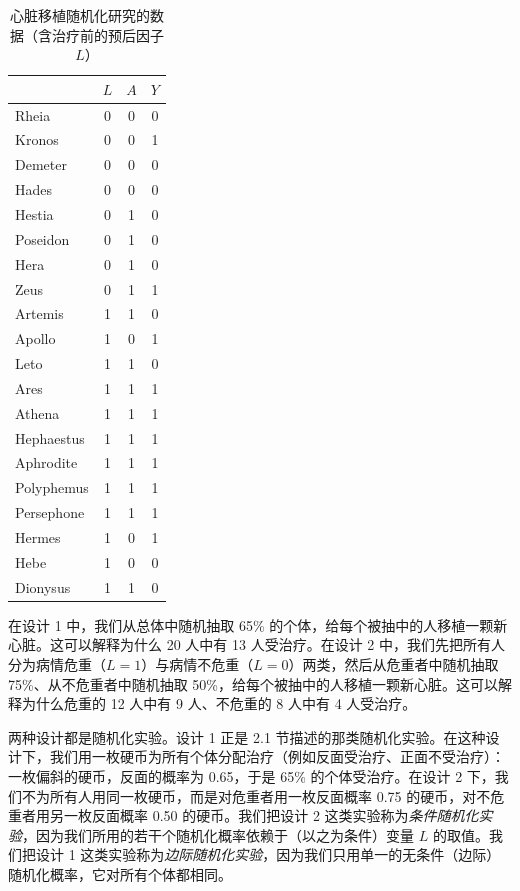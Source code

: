 \begin{table}[t]
\centering
\caption{心脏移植随机化研究的数据（含治疗前的预后因子 $L$）}
\label{tab:2.2}
\small
\begin{tabular}{lccc}
\toprule
& $L$ & $A$ & $Y$\\
\midrule
Rheia      & 0 & 0 & 0\\
Kronos     & 0 & 0 & 1\\
Demeter    & 0 & 0 & 0\\
Hades      & 0 & 0 & 0\\
Hestia     & 0 & 1 & 0\\
Poseidon   & 0 & 1 & 0\\
Hera       & 0 & 1 & 0\\
Zeus       & 0 & 1 & 1\\
Artemis    & 1 & 1 & 0\\
Apollo     & 1 & 0 & 1\\
Leto       & 1 & 1 & 0\\
Ares       & 1 & 1 & 1\\
Athena     & 1 & 1 & 1\\
Hephaestus & 1 & 1 & 1\\
Aphrodite  & 1 & 1 & 1\\
Polyphemus & 1 & 1 & 1\\
Persephone & 1 & 1 & 1\\
Hermes     & 1 & 0 & 1\\
Hebe       & 1 & 0 & 0\\
Dionysus   & 1 & 1 & 0\\
\bottomrule
\end{tabular}
\end{table}

在设计 1 中，我们从总体中随机抽取 65\% 的个体，给每个被抽中的人移植一颗新心脏。这可以解释为什么 20 人中有 13 人受治疗。在设计 2 中，我们先把所有人分为病情危重（$L=1$）与病情不危重（$L=0$）两类，然后从危重者中随机抽取 75\%、从不危重者中随机抽取 50\%，给每个被抽中的人移植一颗新心脏。这可以解释为什么危重的 12 人中有 9 人、不危重的 8 人中有 4 人受治疗。

两种设计都是随机化实验。设计 1 正是 2.1 节描述的那类随机化实验。在这种设计下，我们用一枚硬币为所有个体分配治疗（例如反面受治疗、正面不受治疗）：一枚偏斜的硬币，反面的概率为 0.65，于是 65\% 的个体受治疗。在设计 2 下，我们不为所有人用同一枚硬币，而是对危重者用一枚反面概率 0.75 的硬币，对不危重者用另一枚反面概率 0.50 的硬币。我们把设计 2 这类实验称为\emph{条件随机化实验}，因为我们所用的若干个随机化概率依赖于（以之为条件）变量 $L$ 的取值。我们把设计 1 这类实验称为\emph{边际随机化实验}，因为我们只用单一的无条件（边际）随机化概率，它对所有个体都相同。

